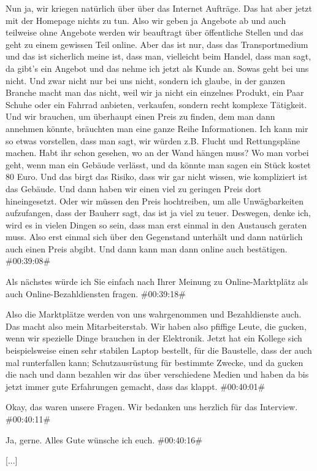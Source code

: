 \begin{description}
\Andre Nun ja, wir kriegen natürlich über über das Internet Aufträge. Das hat aber jetzt mit der Homepage nichts zu tun. Also wir geben ja Angebote ab und auch teilweise ohne Angebote werden wir beauftragt über öffentliche Stellen und das geht zu einem gewissen Teil online. Aber das ist nur, dass das Transportmedium und das ist sicherlich meine ist, dass man, vielleicht beim Handel, dass man sagt, da gibt's ein Angebot und das nehme ich jetzt als Kunde an. Sowas geht bei uns nicht. Und zwar nicht nur bei uns nicht, sondern ich glaube, in der ganzen Branche macht man das nicht, weil wir ja nicht ein einzelnes Produkt, ein Paar Schuhe oder ein Fahrrad anbieten, verkaufen, sondern recht komplexe Tätigkeit. Und wir brauchen, um überhaupt einen Preis zu finden, dem man dann annehmen könnte, bräuchten man eine ganze Reihe Informationen. Ich kann mir so etwas vorstellen, dass man sagt, wir würden z.B. Flucht und Rettungspläne machen. Habt ihr schon gesehen, wo an der Wand hängen muss? Wo man vorbei geht, wenn man ein Gebäude verlässt, und da könnte man sagen ein Stück kostet 80 Euro. Und das birgt das Risiko, dass wir gar nicht wissen, wie kompliziert ist das Gebäude. Und dann haben wir einen viel zu geringen Preis dort hineingesetzt. Oder wir müssen den Preis hochtreiben, um alle Unwägbarkeiten aufzufangen, dass der Bauherr sagt, das ist ja viel zu teuer. Deswegen, denke ich, wird es in vielen Dingen so sein, dass man erst einmal in den Austausch geraten muss. Also erst einmal sich über den Gegenstand unterhält und dann natürlich auch einen Preis abgibt. Und dann kann man dann online auch bestätigen. \#00:39:08\#

\Toni Als nächstes würde ich Sie einfach nach Ihrer Meinung zu Online-Marktplätz als auch Online-Bezahldiensten fragen. \#00:39:18\#

\Andre Also die Marktplätze werden von uns wahrgenommen und Bezahldienste auch. Das macht also mein Mitarbeiterstab. Wir haben also pfiffige Leute, die gucken, wenn wir spezielle Dinge brauchen in der Elektronik. Jetzt hat ein Kollege sich beispielsweise einen sehr stabilen Laptop bestellt, für die Baustelle, dass der auch mal runterfallen kann; Schutzausrüstung für bestimmte Zwecke, und da gucken die nach und dann bezahlen wir das über verschiedene Medien und haben da bis jetzt immer gute Erfahrungen gemacht, dass das klappt. \#00:40:01\#

\Fabian Okay, das waren unsere Fragen. Wir bedanken uns herzlich für das Interview. \#00:40:11\#

\Andre Ja, gerne. Alles Gute wünsche ich euch. \#00:40:16\#

[...]

\end{description}

\normalsize
